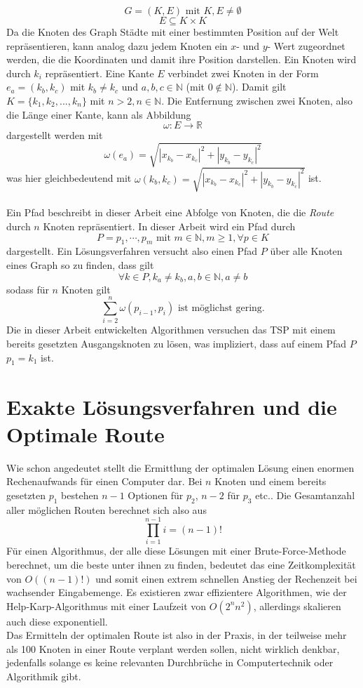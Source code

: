 $$G=(K,E) \textrm{ mit } K,E \neq \emptyset$$
$$E \subseteq K \times K$$
Da die Knoten des Graph Städte mit einer bestimmten Position auf der Welt repräsentieren, kann analog dazu jedem Knoten ein $x$- und $y$- Wert zugeordnet werden, die die Koordinaten und damit ihre Position darstellen.
Ein Knoten wird durch $k_i$ repräsentiert.
Eine Kante $E$ verbindet zwei Knoten in der Form $e_a = (k_b,k_c)$ mit $k_b \neq k_c$ und $a,b,c \in \mathbb{N}$ (mit $0 \not \in \mathbb{N}$).
Damit gilt $K=\{k_1,k_2,...,k_n\}$ mit $n > 2, n \in \mathbb{N}$.
Die Entfernung zwischen zwei Knoten, also die Länge einer Kante, kann als Abbildung $$\omega : E \rightarrow \mathbb{R}$$ 
dargestellt werden mit 
$$\omega(e_a) = \sqrt{|x_{k_b} - x_{k_c}|^2 + |y_{k_b} - y_{k_c}|^2}$$
was hier gleichbedeutend mit $\omega(k_b,k_c) = \sqrt{|x_{k_b} - x_{k_c}|^2 + |y_{k_b} - y_{k_c}|^2}$ ist.
\\\\
Ein Pfad beschreibt in dieser Arbeit eine Abfolge von Knoten, die die \textit{Route} durch $n$ Knoten repräsentiert. In dieser Arbeit wird ein Pfad durch
$$P=p_1,\cdots,p_m \textrm{ mit } m\in\mathbb{N},m \geq 1, \forall p \in K$$
dargestellt.
Ein Lösungsverfahren versucht also einen Pfad $P$ über alle Knoten eines Graph so zu finden, dass gilt
$$\forall k \in P,k_a \neq k_b, a,b\in \mathbb{N},a\neq b $$
sodass für $n$ Knoten gilt
$$\sum_{i=2}^n \omega(p_{i-1},p_i) \textrm{ ist möglichst gering.}$$
Die in dieser Arbeit entwickelten Algorithmen versuchen das \ac{TSP} mit einem bereits gesetzten Ausgangsknoten zu lösen, was impliziert, dass auf einem Pfad $P$ $p_1 = k_1$ ist.
\section{Exakte Lösungsverfahren und die Optimale Route}
Wie schon angedeutet stellt die Ermittlung der optimalen Lösung einen enormen Rechenaufwands für einen Computer dar.
Bei $n$ Knoten und einem bereits gesetzten $p_1$ bestehen $n-1$ Optionen für $p_2$, $n-2$ für $p_3$ etc..
Die Gesamtanzahl aller möglichen Routen berechnet sich also aus
$$\prod_{i=1}^{n-1} i = (n-1)!$$
Für einen Algorithmus, der alle diese Lösungen mit einer Brute-Force-Methode berechnet, um die beste unter ihnen zu finden, bedeutet das eine Zeitkomplexität von $O((n-1)!)$ und somit einen extrem schnellen Anstieg der Rechenzeit bei wachsender Eingabemenge.\autocite[18]{Gurski.2010}
Es existieren zwar effizientere Algorithmen, wie der Help-Karp-Algorithmus\autocite[14]{Hutchinson.2016} mit einer Laufzeit von $O(2^nn^2)$, allerdings skalieren auch diese exponentiell.
\\
Das Ermitteln der optimalen Route ist also in der Praxis, in der teilweise mehr als 100 Knoten in einer Route verplant werden sollen, nicht wirklich denkbar, jedenfalls solange es keine relevanten Durchbrüche in Computertechnik oder Algorithmik gibt.

